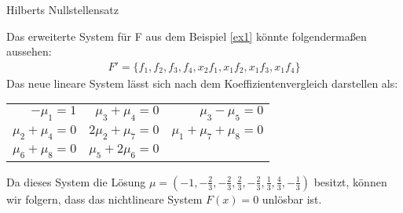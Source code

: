 \begin{mslide}{Hilberts Nullstellensatz}
\begin{ex}
Das erweiterte System für F aus dem Beispiel \ref{ex1} könnte folgendermaßen aussehen:
\begin{align*}
F'=\{f_1,f_2,f_3,f_4,x_2f_1,x_1f_2,x_1f_3,x_1f_4\}
\end{align*}
Das neue lineare System lässt sich nach dem Koeffizientenvergleich darstellen als:


\begin{table}[h]%
\begin{center}
\begin{tabular}{rrr}
$-\mu_1=1$ & $\mu_3+\mu_4=0$ & $\mu_3-\mu_5=0$ \\
$\mu_2+\mu_4=0$ & $2\mu_2+\mu_7=0$ & $\mu_1+\mu_7+\mu_8=0$ \\
$\mu_6 + \mu_8 = 0$ & $\mu_5+2\mu_6 = 0$
\end{tabular}
\label{}
\end{center}
\end{table}

\noindent Da dieses System die Lösung $\mu = (-1,-\frac{2}{3},-\frac{2}{3},\frac{2}{3},-\frac{2}{3},\frac{1}{3},\frac{4}{3},-\frac{1}{3})$ besitzt, können wir folgern, dass das nichtlineare System $F(x) = 0$ unlösbar ist.
\end{ex}

\end{mslide}

